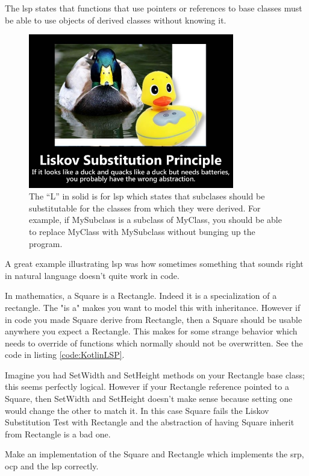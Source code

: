 \begin{framed}
	The \gls{lsp} states that functions that use pointers or references to base classes must be able to use objects of derived classes without knowing it.
\end{framed}
\begin{figure}
	\centering
	\includegraphics[width=0.8\textwidth]{images/kotlin/LSP.jpg}
	\caption{The “L” in \gls{solid} is for \gls{lsp} which states that subclases should be substitutable for the classes from which they were derived. For example, if MySubclass is a subclass of MyClass, you should be able to replace MyClass with MySubclass without bunging up the program.}
	\label{fir:LSP}
\end{figure}
A great example illustrating \gls{lsp}  was how sometimes something that sounds right in natural language doesn't quite work in code.

In mathematics, a Square is a Rectangle. Indeed it is a specialization of a rectangle. The "is a" makes you want to model this with inheritance. However if in code you made Square derive from Rectangle, then a Square should be usable anywhere you expect a Rectangle. This makes for some strange behavior which needs to override of functions which normally should not be overwritten. See the code in listing \ref{code:KotlinLSP}.




Imagine you had SetWidth and SetHeight methods on your Rectangle base class; this seems perfectly logical. However if your Rectangle reference pointed to a Square, then SetWidth and SetHeight doesn't make sense because setting one would change the other to match it. In this case Square fails the Liskov Substitution Test with Rectangle and the abstraction of having Square inherit from Rectangle is a bad one.



\begin{exercise}
	Make an implementation of the Square and Rectangle which implements the \gls{srp},  \gls{ocp}  and the \gls{lsp} correctly. 
\end{exercise}